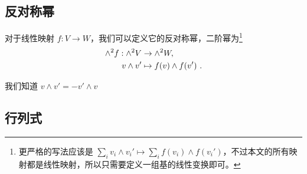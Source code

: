 

\subsection{反对称幂}

对于线性映射 $f: V \to W$，我们可以定义它的反对称幂，二阶幂为\footnote{更严格的写法应该是 $\sum_i v_i \wedge v_i' \mapsto \sum_i f(v_i) \wedge f(v_i')$，不过本文的所有映射都是线性映射，所以只需要定义一组基的线性变换即可。}
\begin{equation}
\begin{aligned}
{\large \wedge}^2 f: {\large \wedge}^2 V &\to {\large \wedge}^2 W, \\
v \wedge v' &\mapsto f(v) \wedge f(v')~.
\end{aligned}
\end{equation}

我们知道 $v \wedge v' = - v' \wedge v$


\subsection{行列式}

